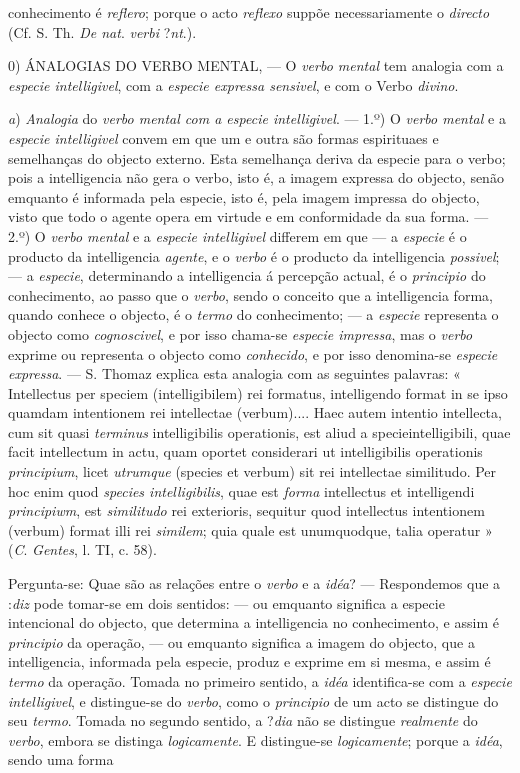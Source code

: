 conhecimento é \emph{reflero}; porque o acto \emph{reflexo} suppõe necessariamente o \emph{directo} (Cf. S. Th. \emph{De nat}. \emph{verbi} ?\emph{nt}.).\par 0) \textsc{ÁNALOGIAS} DO VERBO MENTAL, --- O \emph{verbo mental} tem analogia com a \emph{especie intelligivel}, com a \emph{especie expressa sensivel}, e com o Verbo \emph{divino}.\par \emph{a}) \emph{Analogia} do \emph{verbo mental com a especie intelligivel}. --- 1.º) O \emph{verbo mental} e a \emph{especie intelligivel} convem em que um e outra são formas espirituaes e semelhanças do objecto externo. Esta semelhança deriva da especie para o verbo; pois a intelligencia não gera o verbo, isto é, a imagem expressa do objecto, senão emquanto é informada pela especie, isto é, pela imagem impressa do objecto, visto que todo o agente opera em virtude e em conformidade da sua forma. --- 2.º) O \emph{verbo mental} e a \emph{especie intelligivel} differem em que --- a \emph{especie} é o producto da intelligencia \emph{agente}, e o \emph{verbo} é o producto da intelligencia \emph{possivel}; --- a \emph{especie}, determinando a intelligencia á percepção actual, é o \emph{principio} do conhecimento, ao passo que o \emph{verbo}, sendo o conceito que a intelligencia forma, quando conhece o objecto, é o \emph{termo} do conhecimento; --- a \emph{especie} representa o objecto como \emph{cognoscivel}, e por isso chama-se \emph{especie impressa}, mas o \emph{verbo} exprime ou representa o objecto como \emph{conhecido}, e por isso denomina-se \emph{especie expressa}. --- S. Thomaz explica esta analogia com as seguintes palavras: « Intellectus per speciem (intelligibilem) rei formatus, intelligendo format in se ipso quamdam intentionem rei intellectae (verbum).... Haec autem intentio intellecta, cum sit quasi \emph{terminus} intelligibilis operationis, est aliud a specieintelligibili, quae facit intellectum in actu, quam oportet considerari ut intelligibilis operationis \emph{principium}, licet \emph{utrumque} (species et verbum) sit rei intellectae similitudo. Per hoc enim quod \emph{species intelligibilis}, quae est \emph{forma} intellectus et intelligendi \emph{principiwm}, est \emph{similitudo} rei exterioris, sequitur quod intellectus intentionem (verbum) format illi rei \emph{similem}; quia quale est unumquodque, talia operatur » (\emph{C}. \emph{Gentes}, l. TI, c. 58).\par Pergunta-se: Quae são as relações entre o \emph{verbo} e a \emph{idéa}? --- Respondemos que a :\emph{diz} pode tomar-se em dois sentidos: --- ou emquanto significa a especie intencional do objecto, que determina a intelligencia no conhecimento, e assim é \emph{principio} da operação, --- ou emquanto significa a imagem do objecto, que a intelligencia, informada pela especie, produz e exprime em si mesma, e assim é \emph{termo} da operação. Tomada no primeiro sentido, a \emph{idéa} identifica-se com a \emph{especie intelligivel}, e distingue-se do \emph{verbo}, como o \emph{principio} de um acto se distingue do seu \emph{termo}. Tomada no segundo sentido, a ?\emph{dia} não se distingue \emph{realmente} do \emph{verbo}, embora se distinga \emph{logicamente}. E distingue-se \emph{logicamente}; porque a \emph{idéa}, sendo uma forma 